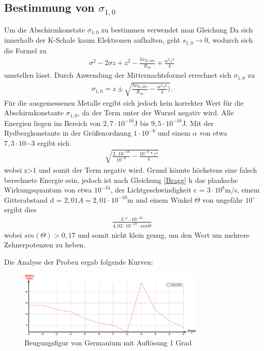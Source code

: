 \subsection{Bestimmung von $\sigma_{1,0}$}
Um die Abschirmkonstate $\sigma_{1,0}$ zu bestimmen verwendet man Gleichung %
Da sich innerhalb der K-Schale kaum Elektronen aufhalten, geht $s_{1,0}\rightarrow 0$, wodurch sich die Formel zu
\begin{align}
\sigma^2-2\sigma z+z^2-\frac{h\nu_{K,abs}}{R_\infty}+\frac{\alpha^2z^4}{4}
\end{align}
umstellen lässt.
Durch Anwendung der Mitternachtsformel errechnet sich $\sigma_{1,0}$ zu
\begin{align}
\sigma_{1,0}=z\pm\sqrt{\frac{h\nu_{K,abs}}{R_\infty}-\frac{\alpha^2z^4}{4})}.
\end{align}
Für die ausgemessenen Metalle ergibt sich jedoch kein korrekter Wert für die Abschirmkonstante $\sigma_{1,0}$, da der 
Term unter der Wurzel negativ wird. Alle Energien liegen im Bereich von $2,7\cdot10^{-16}$J bis  
$9,5\cdot10^{-16}$J. Mit der Rydbergkonstante in der Größenordnung $1\cdot 10^{-8}$ und einem $\alpha$ von etwa 
$7,3\cdot 10{-3}$ ergibt sich
\begin{align*}
\sqrt{\frac{2\cdot10^{-16}}{10^{-8}}-\frac{10^{-6}*z^4}{4}}
\end{align*}
wobei z>1 und somit der Term negativ wird. Grund könnte höchstens eine falsch berechnete Energie sein, jedoch ist nach Gleichung \ref{Bragg} h das planksche Wirkungsquantum von etwa $10^{-34}$, der Lichtgeschwindigkeit c = $3\cdot10^{8}$m/s, einem Gitterabstand d = $2,01A = 2,01\cdot10^{-10}$m und einem Winkel $\Theta$ von ungefähr $10^\circ$ ergibt dies
\begin{align*}
\frac{3\cdot^{8}\cdot10^{-34}}{4,02\cdot10^{-10}\cdot sin\Theta}
\end{align*}
wobei $sin(\Theta)>0,17$ und somit nicht klein genug, um den Wert um mehrere Zehnerpotenzen zu heben.

Die Analyse der Proben ergab folgende Kurven:

\begin{figure}[H]
\includegraphics[width=0.8\textwidth] {pics/germanium01.png}
\centering
\caption{Beugungsfigur von Germanium mit Auflösung 1 Grad}
\label{Aufbau}
\end{figure}

